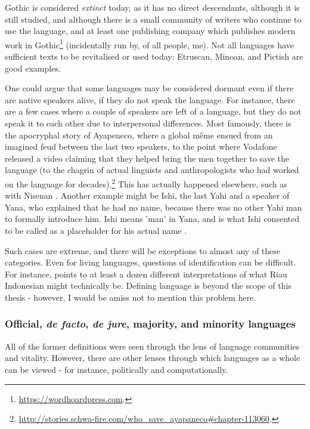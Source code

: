 Gothic is considered \textit{extinct} today, as it has no direct descendants, although it is still studied, and although there is a small community of writers who continue to use the language, and at least one publishing company which publishes modern work in Gothic\footnote{\href{https://wordhoardpress.com}{https://wordhoardpress.com}. } (incidentally run by, of all people, me). Not all languages have sufficient texts to be revitalised or used today: Etruscan, Minoan, and Pictish are good examples.

One could argue that some languages may be considered dormant even if there are native speakers alive, if they do not speak the language. For instance, there are a few cases where a couple of speakers are left of a language, but they do not speak it to each other due to interpersonal differences. Most famously, there is the apocryphal story of Ayapeneco, where a global m\^eme ensued from an imagined feud between the last two speakers, to the point where Vodafone released a video claiming that they helped bring the men together to save the language (to the chagrin of actual linguists and anthropologists who had worked on the language for decades).\footnote{\href{http://stories.schwa-fire.com/who_save_ayapaneco\#chapter-113060}{http://stories.schwa-fire.com/who\_save\_ayapaneco\#chapter-113060}. } This has actually happened elsewhere, such as with Nisenan \citep{snyder2004practice}. Another example might be Ishi, the last Yahi and a speaker of Yana, who explained that he had no name, because there was no other Yahi man to formally introduce him. Ishi means 'man' in Yana, and is what Ishi consented to be called as a placeholder for his actual name \citep{kroeber1973ishi}.

Such cases are extreme, and there will be exceptions to almost any of these categories. Even for living languages, questions of identification can be difficult. For instance, \cite{gilRiau} points to at least a dozen different interpretations of what Riau Indonesian might technically be. Defining language is beyond the scope of this thesis - however, I would be amiss not to mention this problem here.

\subsubsection{Official, \textit{de facto}, \textit{de jure}, majority, and minority languages}

All of the former definitions were seen through the lens of language communities and vitality. However, there are other lenses through which languages as a whole can be viewed - for instance, politically and computationally.


